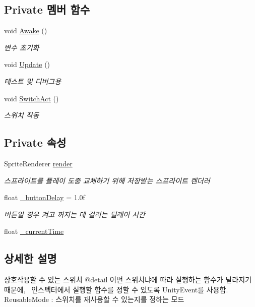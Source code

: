 \subsection*{Private 멤버 함수}
\begin{DoxyCompactItemize}
\item 
void \mbox{\hyperlink{class_switch_a9988b93ae4cd0954c17f4f4bee3ef247}{Awake}} ()
\begin{DoxyCompactList}\small\item\em 변수 초기화 \end{DoxyCompactList}\item 
void \mbox{\hyperlink{class_switch_a7aa3b2489c41c573dc34ef3014faf4a4}{Update}} ()
\begin{DoxyCompactList}\small\item\em 테스트 및 디버그용 \end{DoxyCompactList}\item 
void \mbox{\hyperlink{class_switch_aa1ed0936b7074a24bbb2b46cb9a9465a}{Switch\+Act}} ()
\begin{DoxyCompactList}\small\item\em 스위치 작동 \end{DoxyCompactList}\end{DoxyCompactItemize}
\subsection*{Private 속성}
\begin{DoxyCompactItemize}
\item 
Sprite\+Renderer \mbox{\hyperlink{class_switch_a91fdd02a949dd741f026a21104ab50dc}{render}}
\begin{DoxyCompactList}\small\item\em 스프라이트를 플레이 도중 교체하기 위해 저장받는 스프라이트 렌더러 \end{DoxyCompactList}\item 
float \mbox{\hyperlink{class_switch_aa48b86d0289cb6ec86a63798760739ba}{\+\_\+button\+Delay}} = 1.\+0f
\begin{DoxyCompactList}\small\item\em 버튼일 경우 켜고 꺼지는 데 걸리는 딜레이 시간 \end{DoxyCompactList}\item 
float \mbox{\hyperlink{class_switch_a24a92f60741278f45ea7d4ba0b5e1ce7}{\+\_\+current\+Time}}
\end{DoxyCompactItemize}


\subsection{상세한 설명}
상호작용할 수 있는 스위치 @detail 어떤 스위치냐에 따라 실행하는 함수가 달라지기 때문에,~\newline
인스펙터에서 실행할 함수를 정할 수 있도록 Unity\+Event를 사용함.~\newline
Reusable\+Mode \+: 스위치를 재사용할 수 있는지를 정하는 모드~\newline



